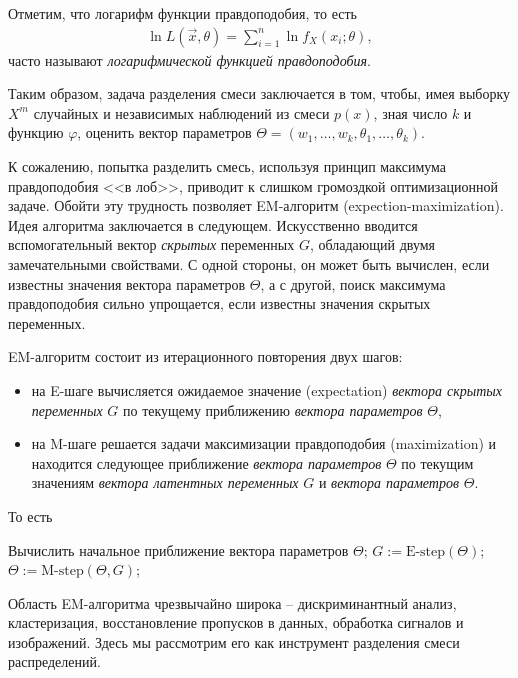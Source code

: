 \documentclass[%
	11pt,
	a4paper,
	utf8,
		]{article}
\begin{document}
Отметим, что логарифм функции правдоподобия, то есть
\begin{align*}
	\ln L(\vec{x}, \theta) = \sum_{i=1}^{n} \ln f_X(x_i; \theta),
\end{align*}
часто называют \emph{логарифмической функцией правдоподобия}.

Таким образом, задача разделения смеси заключается в том, чтобы, имея выборку $ X^m $ случайных и независимых наблюдений из смеси $ p(x) $, зная число $ k $ и функцию $ \varphi $, оценить вектор параметров $ \Theta = (w_1, \ldots, w_k, \theta_1, \ldots, \theta_k) $.

К сожалению, попытка разделить смесь, используя принцип максимума правдоподобия <<в лоб>>, приводит к слишком громоздкой оптимизационной задаче. Обойти эту трудность позволяет EM-алгоритм (expection-maximization). Идея алгоритма заключается в следующем. Искусственно вводится вспомогательный вектор \emph{скрытых} переменных $ G $, обладающий двумя замечательными свойствами. С одной стороны, он может быть вычислен, если известны значения вектора параметров $ \Theta $, а с другой, поиск максимума правдоподобия сильно упрощается, если известны значения скрытых переменных.

EM-алгоритм состоит из итерационного повторения двух шагов:
\begin{itemize}
	\item на E-шаге вычисляется ожидаемое значение (expectation) \emph{вектора скрытых переменных} $ G $ по текущему приближению \emph{вектора параметров} $ \Theta $,
	
	\item на M-шаге решается задачи максимизации правдоподобия (maximization) и находится следующее приближение \emph{вектора параметров} $ \Theta $ по текущим значениям \emph{вектора латентных переменных} $ G $ и \emph{вектора параметров} $ \Theta $.
\end{itemize} 

То есть
\begin{algorithmic}[1]
	\STATE Вычислить начальное приближение вектора параметров $ \Theta $;
	\REPEAT
	    \STATE $ G := \text{E-step}(\Theta) $;
	    \STATE $ \Theta := \text{M-step}(\Theta, G) $;
\end{algorithmic}

Область EM-алгоритма чрезвычайно широка -- дискриминантный анализ, кластеризация, восстановление пропусков в данных, обработка сигналов и изображений. Здесь мы рассмотрим его как инструмент разделения смеси распределений.
\end{document}
